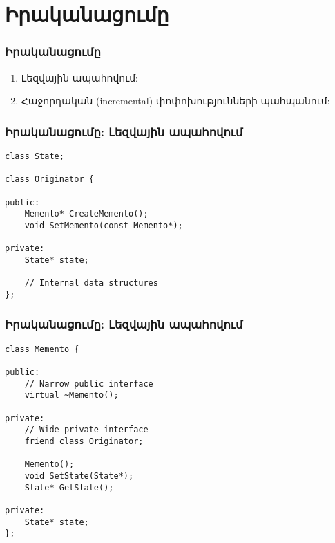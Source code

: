 \documentclass{beamer}
\begin{document}
\section{Իրականացումը}
\begin{frame}\frametitle{Իրականացումը}
\begin{enumerate}
    \item Լեզվային ապահովում: \vfill
    \item Հաջորդական (incremental) փոփոխությունների պահպանում:
\end{enumerate}
\end{frame}
\begin{frame}[fragile]\frametitle{Իրականացումը: Լեզվային ապահովում}
\begin{english}
\begin{verbatim}
class State;

class Originator {

public:
    Memento* CreateMemento();
    void SetMemento(const Memento*);

private:
    State* state;

    // Internal data structures
};
\end{verbatim}
\end{english}
\end{frame}

\begin{frame}[fragile]\frametitle{Իրականացումը: Լեզվային ապահովում}
\begin{english}
\begin{verbatim}
class Memento {

public:
    // Narrow public interface
    virtual ~Memento();

private:
    // Wide private interface
    friend class Originator;

    Memento();
    void SetState(State*);
    State* GetState();

private:
    State* state;
};
\end{verbatim}
\end{english}
\end{frame}
\end{document}
